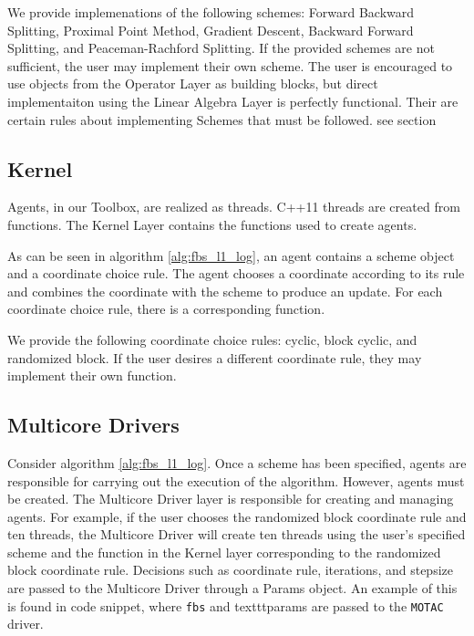 We provide implemenations of the following schemes: Forward Backward Splitting, Proximal Point Method,  Gradient Descent, Backward Forward Splitting, and Peaceman-Rachford Splitting.
If the provided schemes are not sufficient, the user may implement their own scheme.
The user is encouraged to use objects from the Operator Layer as building blocks, but direct implementaiton using the Linear Algebra Layer is perfectly functional. Their are certain rules about implementing Schemes that must be followed. see section




\subsection{Kernel}

Agents, in our Toolbox, are realized as threads. 
C++11 threads are created from functions.
The Kernel Layer contains the functions used to create agents. 

As can be seen in algorithm \ref{alg:fbs_l1_log}, an agent contains a scheme object and a coordinate choice rule.
The agent chooses a coordinate according to its rule and combines the coordinate with the scheme to produce an update.
For each coordinate choice rule, there is a corresponding function.

We provide the following coordinate choice rules: cyclic, block cyclic, and randomized block. 
If the user desires a different coordinate rule, they may implement their own function.
 

\subsection{Multicore Drivers}

Consider algorithm \ref{alg:fbs_l1_log}.
Once a scheme has been specified, agents are responsible for carrying out the execution of the algorithm.
However, agents must be created.
The Multicore Driver layer is responsible for creating and managing agents. 
For example, if the user chooses the randomized block coordinate rule and ten threads, the Multicore Driver will create ten threads using the user's specified scheme and the function in the Kernel layer corresponding to the randomized block coordinate rule. Decisions such as coordinate rule, iterations, and stepsize are passed to the Multicore Driver through a Params object.
An example of this is found in code snippet, where \texttt{fbs} and texttt{params} are passed to the \texttt{MOTAC} driver. 

